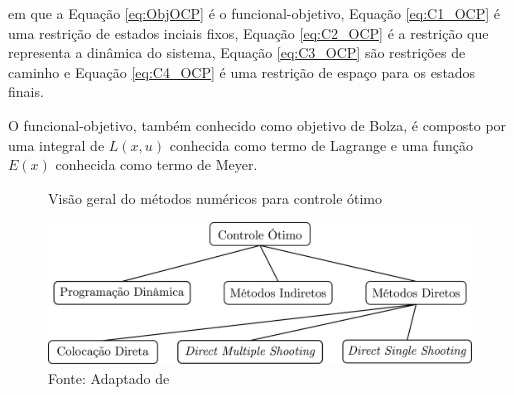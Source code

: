 em que a Equação \ref{eq:ObjOCP} é o funcional-objetivo, Equação \ref{eq:C1_OCP} é uma restrição de estados inciais fixos, Equação \ref{eq:C2_OCP} é
a restrição
que representa a dinâmica
do sistema, Equação \ref{eq:C3_OCP} são restrições de caminho e Equação \ref{eq:C4_OCP} é uma restrição de espaço para os estados finais.

O funcional-objetivo, também conhecido como objetivo de Bolza, é composto por uma integral de $L(x,u)$ conhecida como termo de Lagrange
e uma função $E(x)$ conhecida como termo de Meyer\cite{book:Numerical_Optimal_Control}.

\begin{figure}[H]
	\centering
	\caption{Visão geral do métodos numéricos para controle ótimo}
	\label{fig:diagrama_metodos_numericos}
	\includegraphics{DescricaoProcesso/Figuras/diagrama_metodos_numericos.png}
	\caption*{\footnotesize Fonte: Adaptado de \citeauthor{article:Diehl}}
\end{figure}

\cite{phd:Matthias} \cite{phd:Rieck} \cite{manual:Falcon}

\clearpage